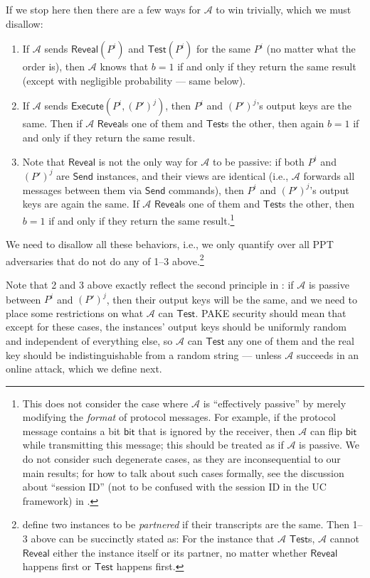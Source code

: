 \documentclass{article}
\newcommand{\adv}{\mathcal{A}}
\newcommand{\Execute}{\mathsf{Execute}}
\newcommand{\Send}{\mathsf{Send}}
\newcommand{\Reveal}{\mathsf{Reveal}}
\newcommand{\Test}{\mathsf{Test}}
\begin{document}
If we stop here then there are a few ways for $\adv$ to win trivially, which we must disallow:
\begin{enumerate}
  \item If $\adv$ sends $\Reveal(P^i)$ and $\Test(P^i)$ for the same $P^i$ (no matter what the order is), then $\adv$ knows that $b = 1$ if and only if they return the same result (except with negligible probability --- same below).
  \item If $\adv$ sends $\Execute(P^i, (P')^j)$, then $P^i$ and $(P')^j$'s output keys are the same. Then if $\adv$ $\Reveal$s one of them and $\Test$s the other, then again $b = 1$ if and only if they return the same result.
  \item Note that $\Reveal$ is not the only way for $\adv$ to be passive: if both $P^i$ and $(P')^j$ are $\Send$ instances, and their views are identical (i.e., $\adv$ forwards all messages between them via $\Send$ commands), then $P^i$ and $(P')^j$'s output keys are again the same. If $\adv$ $\Reveal$s one of them and $\Test$s the other, then $b = 1$ if and only if they return the same result.\footnote{This does not consider the case where $\adv$ is ``effectively passive'' by merely modifying the \emph{format} of protocol messages. For example, if the protocol message contains a bit $\mathsf{bit}$ that is ignored by the receiver, then $\adv$ can flip $\mathsf{bit}$ while transmitting this message; this should be treated as if $\adv$ is passive. We do not consider such degenerate cases, as they are inconsequential to our main results; for how to talk about such cases formally, see the discussion about ``session ID'' (not to be confused with the session ID in the UC framework) in \cite{EC:BelPoiRog00,JACM:KatOstYun09}.}
\end{enumerate}
We need to disallow all these behaviors, i.e., we only quantify over all PPT adversaries that do not do any of 1--3 above.\footnote{\cite{EC:BelPoiRog00,JACM:KatOstYun09} define two instances to be \emph{partnered} if their transcripts are the same. Then 1--3 above can be succinctly stated as: For the instance that $\adv$ $\Test$s, $\adv$ cannot $\Reveal$ either the instance itself or its partner, no matter whether $\Reveal$ happens first or $\Test$ happens first.}

Note that 2 and 3 above exactly reflect the second principle in : if $\adv$ is passive between $P^i$ and $(P')^j$, then their output keys will be the same, and we need to place some restrictions on what $\adv$ can $\Test$. PAKE security should mean that except for these cases, the instances' output keys should be uniformly random and independent of everything else, so $\adv$ can $\Test$ any one of them and the real key should be indistinguishable from a random string --- unless $\adv$ succeeds in an online attack, which we define next.
\end{document}
